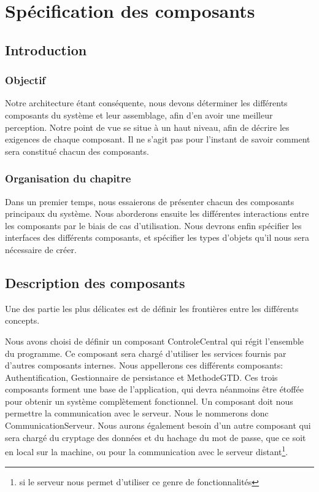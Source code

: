 \chapter{Spécification des composants}

\minitoc

\section{Introduction}

	\subsection{Objectif}
Notre architecture étant conséquente, nous devons déterminer les différents composants du système et leur assemblage, afin d'en avoir une meilleur perception.
Notre point de vue se situe à un haut niveau, afin de décrire les exigences de chaque composant.
Il ne s'agit pas pour l'instant de savoir comment sera constitué chacun des composants.

	\subsection{Organisation du chapitre}
Dans un premier temps, nous essaierons de présenter chacun des composants principaux du système.
Nous aborderons ensuite les différentes interactions entre les composants par le biais de cas d'utilisation.
Nous devrons enfin spécifier les interfaces des différents composants, et spécifier les types d'objets qu'il nous sera nécessaire de créer.

\section{Description des composants}

Une des partie les plus délicates est de définir les frontières entre les différents concepts.

Nous avons choisi de définir un composant ControleCentral qui régit l'ensemble du programme.
Ce composant sera chargé d'utiliser les services fournis par d'autres composants internes.
Nous appellerons ces différents composants: Authentification, Gestionnaire de persistance et MethodeGTD.
Ces trois composants forment une base de l'application, qui devra néanmoins être étoffée pour obtenir un système complètement fonctionnel.
Un composant doit nous permettre la communication avec le serveur. Nous le nommerons donc CommunicationServeur.
Nous aurons également besoin d'un autre composant qui sera chargé du cryptage des données et du hachage du mot de passe, que ce soit en local sur la machine, ou pour la communication avec le serveur distant\footnote{si le serveur nous permet d'utiliser ce genre de fonctionnalités}.

